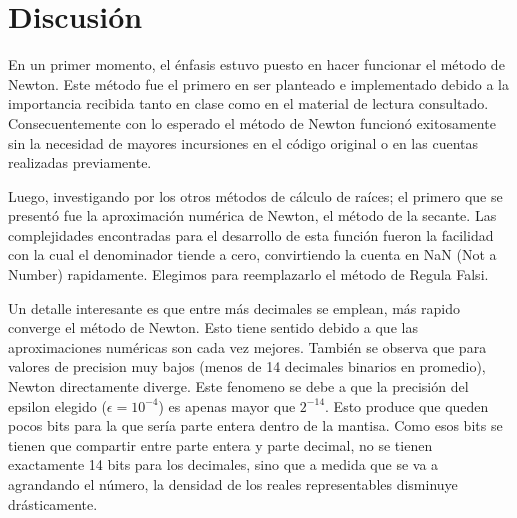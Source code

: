 \section{Discusi\'on}

En un primer momento, el \'enfasis estuvo puesto en hacer funcionar el m\'etodo 
de Newton.
Este m\'etodo fue el primero en ser planteado e implementado debido a la
importancia recibida tanto en clase como en el material de lectura consultado.
Consecuentemente con lo esperado el m\'etodo de Newton funcion\'o exitosamente
sin la necesidad de mayores incursiones en el c\'odigo original o en las cuentas
realizadas previamente.

Luego, investigando por los otros m\'etodos de c\'alculo de ra\'ices; 
el primero que se present\'o fue la aproximaci\'on num\'erica de Newton, 
el m\'etodo de la secante. Las complejidades encontradas para el desarrollo de 
esta funci\'on fueron la facilidad con la cual el denominador tiende a cero, 
convirtiendo la cuenta en NaN (Not a Number) rapidamente. Elegimos para 
reemplazarlo el m\'etodo de Regula Falsi.

Un detalle interesante es que entre m\'as decimales se emplean, m\'as rapido 
converge el m\'etodo de Newton. Esto tiene sentido debido a que las 
aproximaciones num\'ericas son cada vez mejores. Tambi\'en se observa que para 
valores de precision muy bajos (menos de 14 decimales binarios en promedio), 
Newton directamente diverge. 
Este fenomeno se debe a que la precisi\'on del epsilon elegido 
($\epsilon = 10^{-4}$) es apenas mayor que $2^{-14}$. 
Esto produce que queden pocos bits para la que ser\'ia parte entera dentro de 
la mantisa. Como esos bits se tienen que compartir entre parte entera y parte 
decimal, no se tienen exactamente 14 bits para los decimales, sino que a medida 
que se va a agrandando el n\'umero, la densidad de los reales representables 
disminuye dr\'asticamente.

